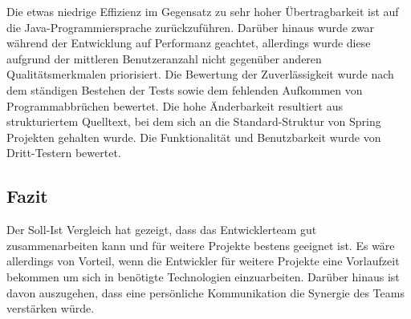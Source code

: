 Die etwas niedrige Effizienz im Gegensatz zu sehr hoher Übertragbarkeit ist auf die Java-Programmiersprache zurückzuführen.
Darüber hinaus wurde zwar während der Entwicklung auf Performanz geachtet, allerdings wurde diese aufgrund
der mittleren Benutzeranzahl nicht gegenüber anderen Qualitätsmerkmalen priorisiert.
Die Bewertung der Zuverlässigkeit wurde nach dem ständigen Bestehen der Tests sowie dem fehlenden Aufkommen von Programmabbrüchen bewertet.
Die hohe Änderbarkeit resultiert aus strukturiertem Quelltext, bei dem sich an die Standard-Struktur von Spring Projekten gehalten wurde.
Die Funktionalität und Benutzbarkeit wurde von Dritt-Testern bewertet.

\subsection{Fazit}
Der Soll-Ist Vergleich hat gezeigt, dass das Entwicklerteam gut zusammenarbeiten kann und für weitere Projekte bestens geeignet ist.
Es wäre allerdings von Vorteil, wenn die Entwickler für weitere Projekte eine Vorlaufzeit bekommen um sich in benötigte
Technologien einzuarbeiten. Darüber hinaus ist davon auszugehen, dass eine persönliche Kommunikation die Synergie des Teams
verstärken würde.







